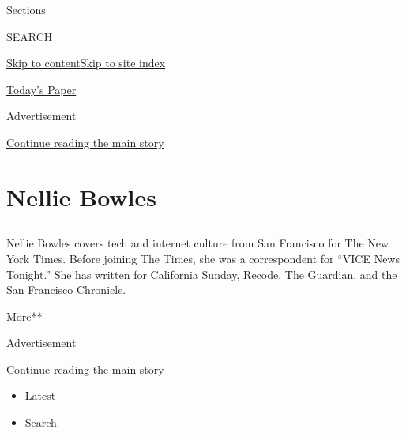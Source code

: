 Sections

SEARCH

\protect\hyperlink{site-content}{Skip to
content}\protect\hyperlink{site-index}{Skip to site index}

\href{https://myaccount.nytimes3xbfgragh.onion/auth/login?response_type=cookie\&client_id=vi}{}

\href{https://www.nytimes3xbfgragh.onion/section/todayspaper}{Today's
Paper}

Advertisement

\protect\hyperlink{after-top}{Continue reading the main story}

\hypertarget{nellie-bowles}{%
\section{Nellie Bowles}\label{nellie-bowles}}

\subsection{}

Nellie Bowles covers tech and internet culture from San Francisco for
The New York Times. Before joining The Times, she was a correspondent
for ``VICE News Tonight.'' She has written for California Sunday,
Recode, The Guardian, and the San Francisco Chronicle.

More**

Advertisement

\protect\hyperlink{after-mid1}{Continue reading the main story}

\begin{itemize}
\tightlist
\item
  \protect\hyperlink{stream-panel}{Latest}
\item
  Search
\end{itemize}

